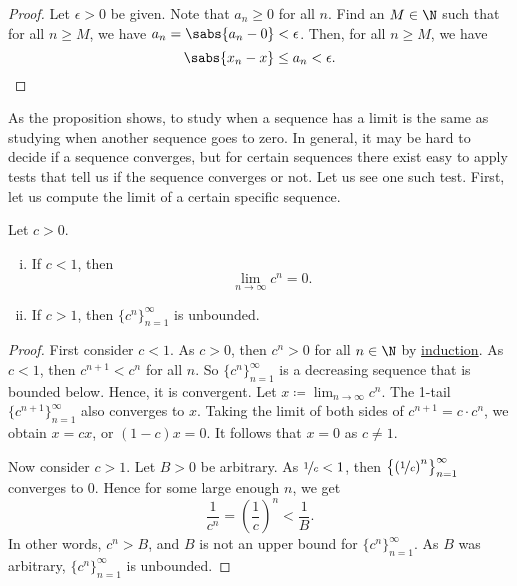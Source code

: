 \begin{proof}
Let $\epsilon > 0$ be given.  Note that $a_n \geq 0$
for all $n$.  Find an $M \in \N$ such that for
all $n \geq M$, we have
$a_n = \sabs{a_n - 0} < \epsilon$.  Then, for all $n \geq M$,
we have
\begin{equation*}
\sabs{x_n - x} \leq a_n < \epsilon . \qedhere
\end{equation*}
\end{proof}

As the proposition shows, to study when a sequence has a limit is 
the same as studying when another sequence goes to zero.
In general, it may be hard to decide if a sequence converges, but
for certain sequences there exist easy to apply tests that tell us
if the sequence converges or not.  Let us see one such test.
First, let
us compute the limit of a certain specific sequence.

\begin{prop}
Let $c > 0$.
\begin{enumerate}[(i)]
\item
If $c < 1$, then
\begin{equation*}
\lim_{n\to\infty} c^n = 0.
\end{equation*}
\item
If $c > 1$, then $\{ c^n \}_{n=1}^\infty$ is unbounded.
\end{enumerate}
\end{prop}

\begin{proof}
First consider $c < 1$.  As $c > 0$, then $c^n > 0$ for all $n \in \N$ by
\hyperref[induction:thm]{induction}.  As $c < 1$, then $c^{n+1} < c^n$ for all $n$.
So $\{ c^n \}_{n=1}^\infty$ is
a decreasing sequence that is bounded below.  Hence, it is convergent.
Let $x \coloneqq \lim_{n\to\infty} c^n$.  The 1-tail $\{ c^{n+1} \}_{n=1}^\infty$
also converges to $x$.  Taking the limit of both sides of $c^{n+1} = c \cdot
c^n$, we obtain $x = cx$, or $(1-c)x=0$.  It follows that $x=0$ as $c \not= 1$.

Now consider $c > 1$.
Let $B > 0$ be arbitrary.
As $\nicefrac{1}{c} < 1$, then $\bigl\{ {(\nicefrac{1}{c})}^n \bigr\}_{n=1}^\infty$
converges to $0$.
Hence for some large enough $n$, we get
\begin{equation*}
\frac{1}{c^n} =
{\left(\frac{1}{c}\right)}^n < \frac{1}{B} .
\end{equation*}
In other words, $c^n > B$, and $B$ is not an upper bound for 
$\{ c^n \}_{n=1}^\infty$.  As $B$ was arbitrary, $\{ c^n \}_{n=1}^\infty$ is unbounded.
\end{proof}

